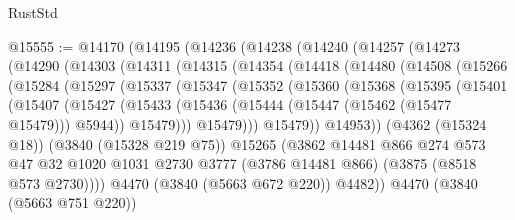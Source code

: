 \begin{lexlean}{RustStd}
\begin{coremodule}
{\begin{coremodule}
{{{{{{{{{{{{{{{{{{{{{{{{{{@15555 := @14170
    (@14195
      (@14236
        (@14238
          (@14240
            (@14257
              (@14273
                (@14290
                  (@14303
                    (@14311
                      (@14315
                        (@14354
                          (@14418
                            (@14480
                              (@14508
                                (@15266
                                  (@15284
                                    (@15297
                                      (@15337
                                        (@15347
                                          (@15352
                                            (@15360
                                              (@15368
                                                (@15395
                                                  (@15401
                                                    (@15407
                                                      (@15427
                                                        (@15433
                                                          (@15436
                                                            (@15444
                                                              (@15447 (@15462 (@15477 @15479)))
                                                              @5944))
                                                          @15479)))
                                                    @15479)))
                                              @15479))
                                          @14953))
                                      (@4362 (@15324 @18))
                                      (@3840 (@15328 @219 @75))
                                      @15265
                                      (@3862
                                        @14481
                                        @866
                                        @274
                                        @573
                                        @47
                                        @32
                                        @1020
                                        @1031
                                        @2730
                                        @3777
                                        (@3786 @14481 @866)
                                        (@3875 (@8518 @573 @2730))))
                                    @4470
                                    (@3840 (@5663 @672 @220))
                                    @4482))
                                @4470
                                (@3840 (@5663 @751 @220))
}}}}}}}}}}}}}}}}}}}}}}}}}}
\end{coremodule}}
\end{coremodule}
\end{lexlean}
